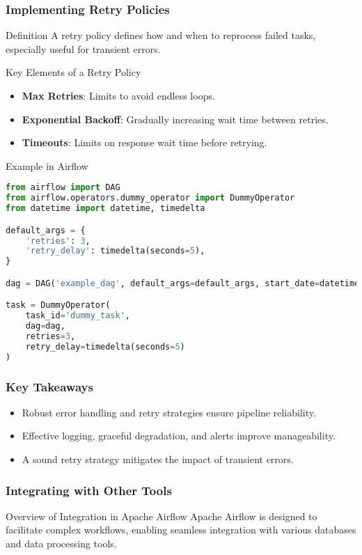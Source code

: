 \documentclass[aspectratio=169]{beamer}
\begin{document}
\begin{frame}[fragile]
    \frametitle{Implementing Retry Policies}
    \begin{block}{Definition}
        A retry policy defines how and when to reprocess failed tasks, especially useful for transient errors.
    \end{block}
    \begin{block}{Key Elements of a Retry Policy}
        \begin{itemize}
            \item \textbf{Max Retries}: Limits to avoid endless loops.
            \item \textbf{Exponential Backoff}: Gradually increasing wait time between retries.
            \item \textbf{Timeouts}: Limits on response wait time before retrying.
        \end{itemize}
    \end{block}
    \begin{block}{Example in Airflow}
        \begin{lstlisting}[language=Python]
from airflow import DAG
from airflow.operators.dummy_operator import DummyOperator
from datetime import datetime, timedelta

default_args = {
    'retries': 3,
    'retry_delay': timedelta(seconds=5),
}

dag = DAG('example_dag', default_args=default_args, start_date=datetime(2023, 10, 20))

task = DummyOperator(
    task_id='dummy_task',
    dag=dag,
    retries=3,
    retry_delay=timedelta(seconds=5)
)
        \end{lstlisting}
    \end{block}
\end{frame}

\begin{frame}[fragile]
    \frametitle{Key Takeaways}
    \begin{itemize}
        \item Robust error handling and retry strategies ensure pipeline reliability.
        \item Effective logging, graceful degradation, and alerts improve manageability.
        \item A sound retry strategy mitigates the impact of transient errors.
    \end{itemize}
\end{frame}

\begin{frame}
    \frametitle{Integrating with Other Tools}
    \begin{block}{Overview of Integration in Apache Airflow}
        Apache Airflow is designed to facilitate complex workflows, enabling seamless integration with various databases and data processing tools.
    \end{block}
\end{frame}
\end{document}

